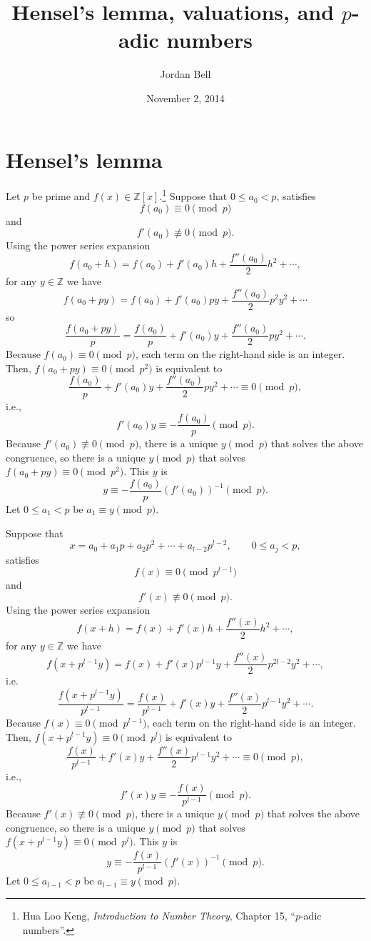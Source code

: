 \documentclass{article}
\theoremstyle{plain}
\theoremstyle{definition}
\begin{document}
\title{Hensel's lemma, valuations, and $p$-adic numbers}
\author{Jordan Bell}
\date{November 2, 2014}

\maketitle

\section{Hensel's lemma}
Let $p$ be prime and $f(x) \in \mathbb{Z}[x]$.\footnote{Hua Loo Keng, {\em Introduction to Number Theory}, Chapter 15, ``$p$-adic numbers''.}
 Suppose that $0 \leq a_0 < p$, satisfies
\[
f(a_0) \equiv 0 \pmod{p}
\]
 and
 \[
 f'(a_0) \not \equiv 0 \pmod{p}.
 \] 
Using the power series expansion
\[
f(a_0+h) = f(a_0)+f'(a_0)h + \frac{f''(a_0)}{2}h^2+\cdots,
\]
 for any $y \in \mathbb{Z}$ we have
 \[
f(a_0+py) = f(a_0)+f'(a_0)py+\frac{f''(a_0)}{2}p^2 y^2 + \cdots
 \]
so
\[
\frac{f(a_0+py)}{p} = \frac{f(a_0)}{p}+f'(a_0)y+\frac{f''(a_0)}{2}p y^2 + \cdots.
\]
Because $f(a_0) \equiv 0 \pmod{p}$, each term on the right-hand side is an integer. 
Then, $f(a_0+py) \equiv 0 \pmod{p^2}$ is equivalent to
\[
\frac{f(a_0)}{p}+f'(a_0)y+\frac{f''(a_0)}{2}p y^2 + \cdots \equiv 0 \pmod{p},
\]
i.e.,
\[
f'(a_0)y \equiv -\frac{f(a_0)}{p} \pmod{p}.
\]
Because $f'(a_0) \not \equiv 0 \pmod{p}$, there is a unique $y \pmod{p}$ that solves the above congruence, 
so there is a unique $y \pmod{p}$ that solves $f(a_0+py) \equiv 0 \pmod{p^2}$. 
This $y$ is 
\[
y \equiv -\frac{f(a_0)}{p} (f'(a_0))^{-1} \pmod{p}.
\]
Let $0 \leq a_1 < p$ be $a_1 \equiv y \pmod{p}$. 

Suppose that 
\[
x=a_0+a_1p+a_2p^2+\cdots+a_{l-2}p^{l-2}, \qquad
0 \leq a_j < p,
\]
satisfies
\[
f(x) \equiv 0 \pmod{p^{l-1}}
\]
and
\[
f'(x) \not \equiv 0 \pmod{p}.
\]
Using the power series expansion
\[
f(x+h)=f(x)+f'(x)h+\frac{f''(x)}{2}h^2+\cdots,
\]
for any $y \in \mathbb{Z}$ we have
\[
f(x+p^{l-1}y) = f(x)+f'(x)p^{l-1}y+\frac{f''(x)}{2}p^{2l-2} y^2 + \cdots,
\]
i.e.
\[
\frac{f(x+p^{l-1}y)}{p^{l-1}} = \frac{f(x)}{p^{l-1}}+f'(x)y+\frac{f''(x)}{2}p^{l-1}y^2+\cdots.
\]
Because $f(x) \equiv 0 \pmod{p^{l-1}}$, each term on the right-hand side is an integer. Then, 
$f(x+p^{l-1}y) \equiv 0 \pmod{p^l}$ is equivalent to
\[
 \frac{f(x)}{p^{l-1}}+f'(x)y+\frac{f''(x)}{2}p^{l-1}y^2+\cdots \equiv 0 \pmod{p},
\]
i.e.,
\[
f'(x)y \equiv - \frac{f(x)}{p^{l-1}} \pmod{p}.
\]
Because $f'(x) \not \equiv 0 \pmod{p}$, there is a unique $y \pmod{p}$ that solves the above congruence, so there
is a unique $y \pmod{p}$ that solves $f(x+p^{l-1}y) \equiv 0 \pmod{p^l}$. This $y$ is
\[
y \equiv - \frac{f(x)}{p^{l-1}} (f'(x))^{-1} \pmod{p}.
\]
Let $0 \leq a_{l-1} < p$ be $a_{l-1} \equiv y \pmod{p}$. 
\end{document}
